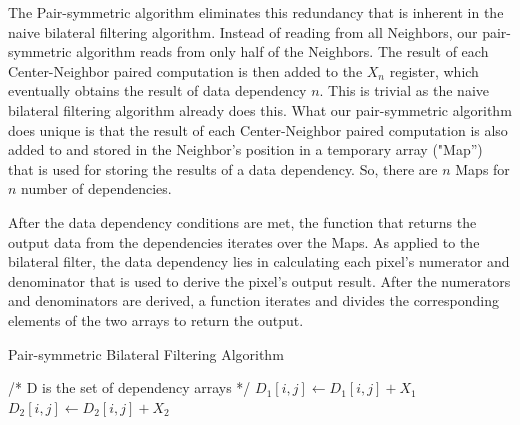 \documentclass{IEEEtran}
\begin{document}
The Pair-symmetric algorithm eliminates this redundancy that is inherent in the naive bilateral filtering algorithm. Instead of reading from all Neighbors, our pair-symmetric algorithm reads from only half of the Neighbors. The result of each Center-Neighbor paired computation is then added to the $X_n$ register, which eventually obtains the result of data dependency $n$. This is trivial as the naive bilateral filtering algorithm already does this. What our pair-symmetric algorithm does unique is that the result of each Center-Neighbor paired computation is also added to and stored in the Neighbor's position in a temporary array ("Map'') that is used for storing the results of a data dependency. So, there are $n$ Maps for $n$ number of dependencies. 

After the data dependency conditions are met, the function that returns the output data from the dependencies iterates over the Maps. As applied to the bilateral filter, the data dependency lies in calculating each pixel's numerator and denominator that is used to derive the pixel's output result. After the numerators and denominators are derived, a function iterates and divides the corresponding elements of the two arrays to return the output. 


\begin{algorithm}[h]
\caption{Pair-symmetric Bilateral Filtering Algorithm}
\label{alg:Example-Algorithm-float-1}
\begin{algorithmic}
\STATE /* D is the set of dependency arrays */
\ENDFOR
{}
\ENDFOR
{}
\ENDFOR
{}
\ENDFOR
\STATE $D_1[i,j] \leftarrow D_1[i,j] + X_1$
\STATE $D_2[i,j] \leftarrow D_2[i,j] + X_2$
\ENDFOR
{}
\ENDFOR
\end{algorithmic}
\end{algorithm}
\end{document}
